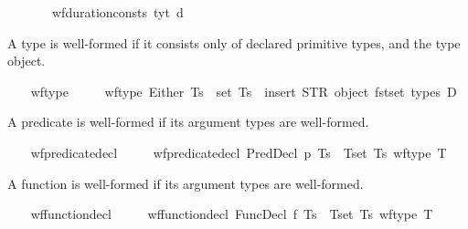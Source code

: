 \begin{isabellebody}
\ \ \ \ \ \ {\isasymand}\ wf{\isacharunderscore}{\kern0pt}duration{\isacharunderscore}{\kern0pt}consts\ tyt\ d{\isacharparenright}{\kern0pt}{\isachardoublequoteclose}%
\begin{isamarkuptext}%
A type is well-formed if it consists only of declared primitive types,
     and the type object.%
\end{isamarkuptext}\isamarkuptrue%
\ \ \isamarkupfalse%
\ wf{\isacharunderscore}{\kern0pt}type\ \isanewline
\ \ \ \ {\isachardoublequoteopen}wf{\isacharunderscore}{\kern0pt}type\ {\isacharparenleft}{\kern0pt}Either\ Ts{\isacharparenright}{\kern0pt}\ {\isasymlongleftrightarrow}\ set\ Ts\ {\isasymsubseteq}\ insert\ {\isacharparenleft}{\kern0pt}STR\ {\isacharprime}{\kern0pt}{\isacharprime}{\kern0pt}object{\isacharprime}{\kern0pt}{\isacharprime}{\kern0pt}{\isacharparenright}{\kern0pt}\ {\isacharparenleft}{\kern0pt}fst{\isacharbackquote}{\kern0pt}set\ {\isacharparenleft}{\kern0pt}types\ D{\isacharparenright}{\kern0pt}{\isacharparenright}{\kern0pt}{\isachardoublequoteclose}%
\begin{isamarkuptext}%
A predicate is well-formed if its argument types are well-formed.%
\end{isamarkuptext}\isamarkuptrue%
\ \ \isamarkupfalse%
\ wf{\isacharunderscore}{\kern0pt}predicate{\isacharunderscore}{\kern0pt}decl\ \isanewline
\ \ \ \ {\isachardoublequoteopen}wf{\isacharunderscore}{\kern0pt}predicate{\isacharunderscore}{\kern0pt}decl\ {\isacharparenleft}{\kern0pt}PredDecl\ p\ Ts{\isacharparenright}{\kern0pt}\ {\isasymlongleftrightarrow}\ {\isacharparenleft}{\kern0pt}{\isasymforall}T{\isasymin}set\ Ts{\isachardot}{\kern0pt}\ wf{\isacharunderscore}{\kern0pt}type\ T{\isacharparenright}{\kern0pt}{\isachardoublequoteclose}%
\begin{isamarkuptext}%
A function is well-formed if its argument types are well-formed.%
\end{isamarkuptext}\isamarkuptrue%
\ \ \isamarkupfalse%
\ wf{\isacharunderscore}{\kern0pt}function{\isacharunderscore}{\kern0pt}decl\ \isanewline
\ \ \ \ {\isachardoublequoteopen}wf{\isacharunderscore}{\kern0pt}function{\isacharunderscore}{\kern0pt}decl\ {\isacharparenleft}{\kern0pt}FuncDecl\ f\ Ts{\isacharparenright}{\kern0pt}\ {\isasymlongleftrightarrow}\ {\isacharparenleft}{\kern0pt}{\isasymforall}T{\isasymin}set\ Ts{\isachardot}{\kern0pt}\ wf{\isacharunderscore}{\kern0pt}type\ T{\isacharparenright}{\kern0pt}{\isachardoublequoteclose}%
\begin{isamarkuptext}%

\end{isamarkuptext}
\end{isabellebody}
